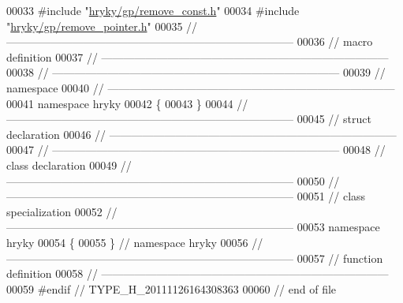 \begin{DoxyCode}
00033 \textcolor{preprocessor}{#include "\hyperlink{remove__const_8h}{hryky/gp/remove_const.h}"}
00034 \textcolor{preprocessor}{#include "\hyperlink{remove__pointer_8h}{hryky/gp/remove_pointer.h}"}
00035 \textcolor{comment}{//
      ------------------------------------------------------------------------------}
00036 \textcolor{comment}{// macro definition}
00037 \textcolor{comment}{//
      ------------------------------------------------------------------------------}
00038 \textcolor{comment}{//
      ------------------------------------------------------------------------------}
00039 \textcolor{comment}{// namespace}
00040 \textcolor{comment}{//
      ------------------------------------------------------------------------------}
00041 \textcolor{keyword}{namespace }hryky
00042 \{
00043 \}
00044 \textcolor{comment}{//
      ------------------------------------------------------------------------------}
00045 \textcolor{comment}{// struct declaration}
00046 \textcolor{comment}{//
      ------------------------------------------------------------------------------}
00047 \textcolor{comment}{//
      ------------------------------------------------------------------------------}
00048 \textcolor{comment}{// class declaration}
00049 \textcolor{comment}{//
      ------------------------------------------------------------------------------}
00050 \textcolor{comment}{//
      ------------------------------------------------------------------------------}
00051 \textcolor{comment}{// class specialization}
00052 \textcolor{comment}{//
      ------------------------------------------------------------------------------}
00053 \textcolor{keyword}{namespace }hryky
00054 \{
00055 \} \textcolor{comment}{// namespace hryky}
00056 \textcolor{comment}{//
      ------------------------------------------------------------------------------}
00057 \textcolor{comment}{// function definition}
00058 \textcolor{comment}{//
      ------------------------------------------------------------------------------}
00059 \textcolor{preprocessor}{#endif // TYPE\_H\_20111126164308363}
00060 \textcolor{preprocessor}{}\textcolor{comment}{// end of file}
\end{DoxyCode}
